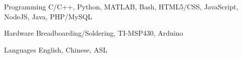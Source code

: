 \texttt{}%



\begin{cvskills}


\cvskill
{Programming} %
{C/C++, Python, MATLAB, Bash, HTML5/CSS, JavaScript, NodeJS, Java, PHP/MySQL} %


\cvskill
{Hardware} %
{Breadboarding/Soldering, TI-MSP430, Arduino} %


\cvskill
{Languages} %
{English, Chinese, ASL} %


\end{cvskills}